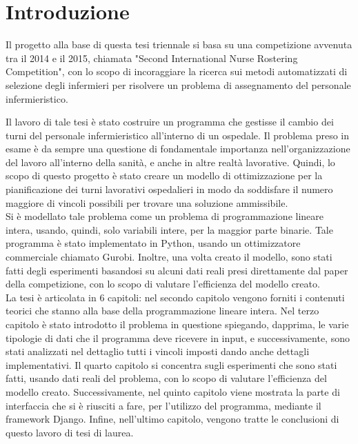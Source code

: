 \chapter{Introduzione}\label{ch:introduzione}
Il progetto alla base di questa tesi triennale si basa su una competizione avvenuta tra il 2014 e il 2015, chiamata  "Second International Nurse Rostering Competition", con lo scopo di incoraggiare la ricerca sui metodi automatizzati di selezione degli infermieri per risolvere un problema di assegnamento del personale infermieristico. 

Il lavoro di tale tesi è stato costruire un programma che gestisse il cambio dei turni del personale infermieristico all'interno di un ospedale.
Il problema preso in esame è da sempre una questione di fondamentale importanza nell'organizzazione del lavoro all'interno della sanità, e anche in altre realtà lavorative. Quindi, lo scopo di questo progetto è stato creare un modello di ottimizzazione per la pianificazione dei turni lavorativi ospedalieri in modo da soddisfare il numero maggiore di vincoli possibili per trovare una soluzione ammissibile. \\

Si è modellato tale problema come un problema di programmazione lineare intera, usando, quindi, solo variabili intere, per la maggior parte binarie. 
Tale programma è stato implementato in Python, usando un ottimizzatore commerciale chiamato Gurobi. Inoltre, una volta creato il modello, sono stati fatti degli esperimenti basandosi su alcuni dati reali presi direttamente dal paper della competizione, con lo scopo di valutare l'efficienza del modello creato. \\

La tesi è articolata in 6 capitoli: nel secondo capitolo vengono forniti i contenuti teorici che stanno alla base della programmazione lineare intera. Nel terzo capitolo è stato introdotto il problema in questione spiegando, dapprima, le varie tipologie di dati che il programma deve ricevere in input, e successivamente, sono stati analizzati nel dettaglio tutti i vincoli imposti dando anche dettagli implementativi.
Il quarto capitolo si concentra sugli esperimenti che sono stati fatti, usando dati reali del problema, con lo scopo di valutare l'efficienza del modello creato.
Successivamente, nel quinto capitolo viene mostrata la parte di interfaccia che si è riusciti a fare, per l'utilizzo del programma, mediante il framework Django.
Infine, nell'ultimo capitolo, vengono tratte le conclusioni di questo lavoro di tesi di laurea.



 